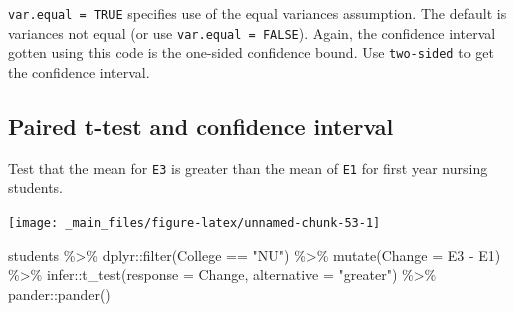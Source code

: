\documentclass[
]{book}
\newenvironment{Shaded}{\begin{snugshade}}{\end{snugshade}}
\newcommand{\AttributeTok}[1]{\textcolor[rgb]{0.77,0.63,0.00}{#1}}
\newcommand{\FunctionTok}[1]{\textcolor[rgb]{0.00,0.00,0.00}{#1}}
\newcommand{\NormalTok}[1]{#1}
\newcommand{\SpecialCharTok}[1]{\textcolor[rgb]{0.00,0.00,0.00}{#1}}
\newcommand{\StringTok}[1]{\textcolor[rgb]{0.31,0.60,0.02}{#1}}
\begin{document}
\texttt{var.equal\ =\ TRUE} specifies use of the equal variances assumption. The default is variances not equal (or use \texttt{var.equal\ =\ FALSE}). Again, the confidence interval gotten using this code is the one-sided confidence bound. Use \texttt{two-sided} to get the confidence interval.

\hypertarget{paired-t-test-and-confidence-interval}{%
\subsection{Paired t-test and confidence interval}\label{paired-t-test-and-confidence-interval}}

Test that the mean for \texttt{E3} is greater than the mean of \texttt{E1} for first year nursing students.

\texttt{[image: \_main\_files/figure-latex/unnamed-chunk-53-1]}

\begin{Shaded}
\begin{Highlighting}[]
\NormalTok{students }\SpecialCharTok{\%\textgreater{}\%} 
\NormalTok{  dplyr}\SpecialCharTok{::}\FunctionTok{filter}\NormalTok{(College }\SpecialCharTok{==} \StringTok{"NU"}\NormalTok{) }\SpecialCharTok{\%\textgreater{}\%} 
  \FunctionTok{mutate}\NormalTok{(}\AttributeTok{Change =}\NormalTok{ E3 }\SpecialCharTok{{-}}\NormalTok{ E1) }\SpecialCharTok{\%\textgreater{}\%} 
\NormalTok{  infer}\SpecialCharTok{::}\FunctionTok{t\_test}\NormalTok{(}\AttributeTok{response =}\NormalTok{ Change, }\AttributeTok{alternative =} \StringTok{"greater"}\NormalTok{) }\SpecialCharTok{\%\textgreater{}\%} 
\NormalTok{  pander}\SpecialCharTok{::}\FunctionTok{pander}\NormalTok{()}
\end{Highlighting}
\end{Shaded}
\end{document}
